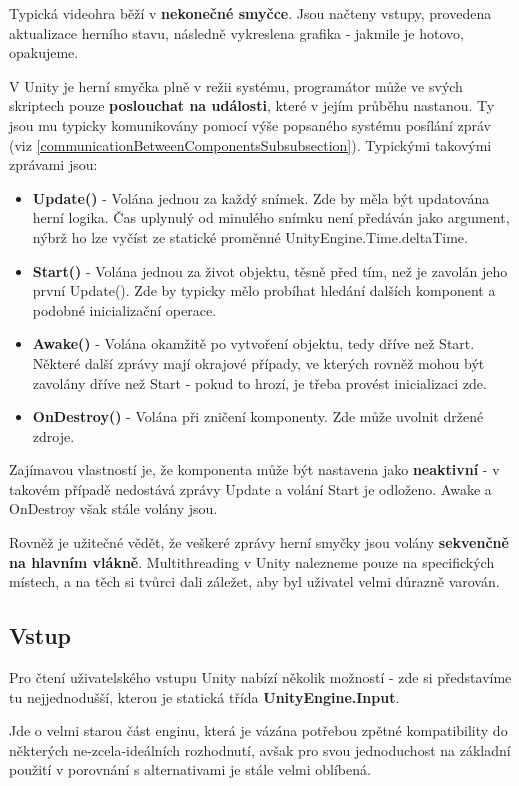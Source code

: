 Typická videohra běží v \textbf{nekonečné smyčce}. Jsou načteny vstupy, provedena aktualizace herního stavu, následně vykreslena grafika - jakmile je hotovo, opakujeme. 

V Unity je herní smyčka plně v režii systému, programátor může ve svých skriptech pouze \textbf{poslouchat na události}, které v jejím průběhu nastanou. Ty jsou mu typicky komunikovány pomocí výše popsaného systému posílání zpráv (viz \ref{communicationBetweenComponentsSubsubsection}).
Typickými takovými zprávami jsou:

\begin{itemize}
    \item \textbf{Update()} - Volána jednou za každý snímek. Zde by měla být updatována herní logika. Čas uplynulý od minulého snímku není předáván jako argument, nýbrž ho lze vyčíst ze statické proměnné UnityEngine.Time.deltaTime.
    \item \textbf{Start()} - Volána jednou za život objektu, těsně před tím, než je zavolán jeho první Update(). Zde by typicky mělo probíhat hledání dalších komponent a podobné inicializační operace.
    \item \textbf{Awake()} - Volána okamžitě po vytvoření objektu, tedy dříve než Start. Některé další zprávy mají okrajové případy, ve kterých rovněž mohou být zavolány dříve než Start - pokud to hrozí, je třeba provést inicializaci zde.
    \item \textbf{OnDestroy()} - Volána při zničení komponenty. Zde může uvolnit držené zdroje.
\end{itemize}
Zajímavou vlastností je, že komponenta může být nastavena jako \textbf{neaktivní} - v takovém případě nedostává zprávy Update a volání Start je odloženo. Awake a OnDestroy však stále volány jsou.

Rovněž je užitečné vědět, že veškeré zprávy herní smyčky jsou volány \textbf{sekvenčně na hlavním vlákně}. Multithreading v Unity nalezneme pouze na specifických místech, a na těch si tvůrci dali záležet, aby byl uživatel velmi důrazně varován.


\subsection{Vstup} \label{unityInputExplanationSubsection}

Pro čtení uživatelského vstupu Unity nabízí několik možností - zde si představíme tu nejjednodušší, kterou je statická třída \textbf{UnityEngine.Input}.

Jde o velmi starou část enginu, která je vázána potřebou zpětné kompatibility do některých ne-zcela-ideálních rozhodnutí, avšak pro svou jednoduchost na základní použití v porovnání s alternativami je stále velmi oblíbená. 

